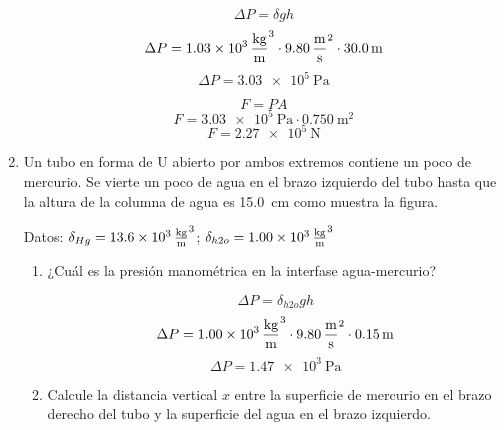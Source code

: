 \documentclass[Análisis.root.tex]{subfiles}
\begin{document}
\begin{enumerate}
        \[\Delta P=\delta gh\]
        \[\Delta P=\SI{1,03e3}{\kilogram\over\meter\cubed}\cdot\SI{9,80}{\meter\over\second\squared}\cdot\SI{30,0}{\meter}\]
        \[\Delta P=\SI{3,03e5}{\pascal}\]

        \[F=PA\]
        \[F=\SI{3,03e5}{\pascal}\cdot\SI{0,750}{\meter\squared}\]
        \[F=\boxed{\SI{2,27e5}{\newton}}\]

        \newpage

  \item Un tubo en forma de U abierto por ambos extremos contiene un poco de mercurio. Se vierte un poco de agua en el brazo izquierdo del tubo hasta que la altura de la columna de agua es \SI{15,0}{\cm} como muestra la figura.

        Datos: $\delta_{Hg}=\SI{13,6e3}{\kilogram\over\meter\cubed}$; $\delta_{h2o}=\SI{1,00e3}{\kilogram\over\meter\cubed}$

        \begin{center}
        \end{center}

        \begin{enumerate}
          \item ¿Cuál es la presión manométrica en la interfase agua-mercurio?

                \[\Delta P=\delta_{h2o}gh\]
                \[\Delta P=\SI{1,00e3}{\kilogram\over\meter\cubed}\cdot\SI{9,80}{\meter\over\second\squared}\cdot\SI{0,15}{\meter}\]
                \[\Delta P=\boxed{\SI{1,47e3}{\pascal}}\]

          \item Calcule la distancia vertical $x$ entre la superficie de mercurio en el brazo derecho del tubo y la superficie del agua en el brazo izquierdo.


\end{enumerate}
\end{enumerate}
\end{document}
